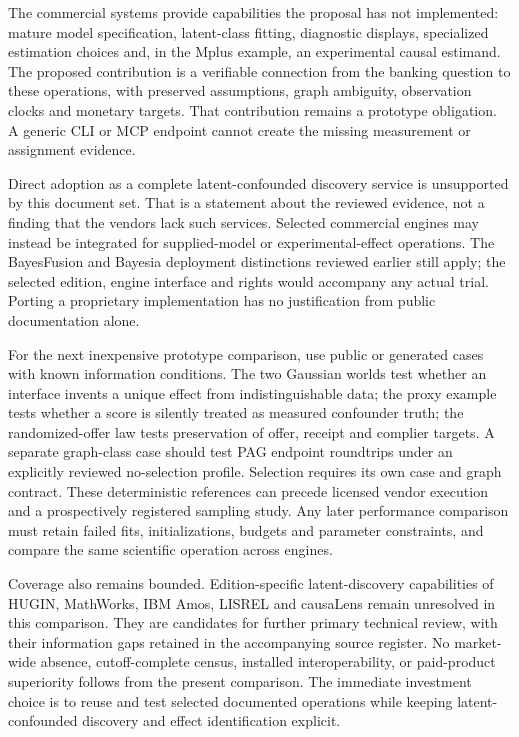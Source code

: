The commercial systems provide capabilities the proposal has not
implemented: mature model specification, latent-class fitting,
diagnostic displays, specialized estimation choices and, in the Mplus
example, an experimental causal estimand. The proposed contribution is a
verifiable connection from the banking question to these operations,
with preserved assumptions, graph ambiguity, observation clocks and
monetary targets. That contribution remains a prototype obligation. A
generic CLI or MCP endpoint cannot create the missing measurement or
assignment evidence.

Direct adoption as a complete latent-confounded discovery service is
unsupported by this document set. That is a statement about the reviewed
evidence, not a finding that the vendors lack such services. Selected
commercial engines may instead be integrated for supplied-model or
experimental-effect operations. The BayesFusion and Bayesia deployment
distinctions reviewed earlier still apply; the selected edition, engine
interface and rights would accompany any actual trial. Porting a
proprietary implementation has no justification from public
documentation alone. \citep{exec13_smile_license,exec13_bayesia_api}

For the next inexpensive prototype comparison, use public or generated
cases with known information conditions. The two Gaussian worlds test
whether an interface invents a unique effect from indistinguishable
data; the proxy example tests whether a score is silently treated as
measured confounder truth; the randomized-offer law tests preservation
of offer, receipt and complier targets. A separate graph-class case
should test PAG endpoint roundtrips under an explicitly reviewed
no-selection profile. Selection requires its own case and graph
contract. These deterministic references can precede licensed vendor
execution and a prospectively registered sampling study. Any later
performance comparison must retain failed fits, initializations, budgets
and parameter constraints, and compare the same scientific operation
across engines.

Coverage also remains bounded. Edition-specific latent-discovery
capabilities of HUGIN, MathWorks, IBM Amos, LISREL and causaLens remain
unresolved in this comparison. They are candidates for further primary
technical review, with their information gaps retained in the
accompanying source register. No market-wide absence, cutoff-complete
census, installed interoperability, or paid-product superiority follows
from the present comparison. The immediate investment choice is to reuse
and test selected documented operations while keeping latent-confounded
discovery and effect identification explicit.
\label{exec13:latent-commercial-end}


